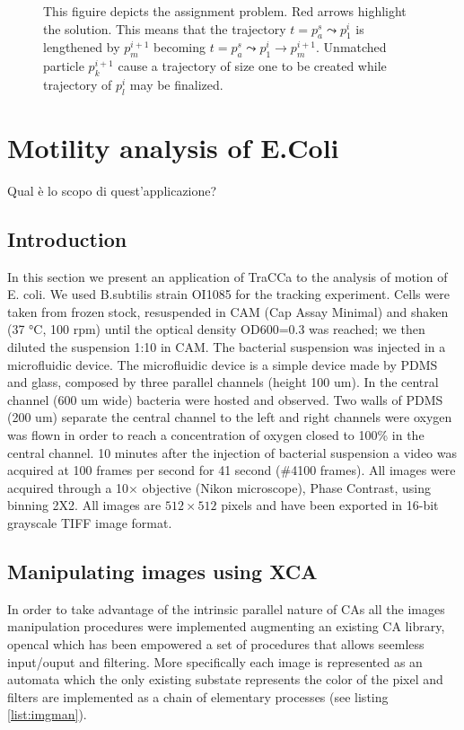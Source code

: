 \documentclass[conference]{IEEEtran}
\begin{document}
\begin{figure}
\label{fig:match}
\caption{This figuire depicts the assignment problem. Red arrows highlight the solution. This means that the trajectory $t=p^s_a \leadsto p^i_1$  is lengthened by $p^{i+1}_m$ becoming $t=p^s_a \leadsto p^i_1 \to p^{i+1}_m$. Unmatched particle $p^{i+1}_k$ cause a  trajectory of size one to be created while trajectory of $p^{i}_l$ may be finalized.}
\end{figure}

\section{Motility analysis of E.Coli}
Qual è lo scopo di quest'applicazione?
\subsection{Introduction}



In this section we present an application of TraCCa to the analysis of motion of E. coli.
We used B.subtilis strain OI1085 for the tracking experiment. Cells were taken from frozen stock, resuspended in CAM (Cap Assay Minimal) and shaken  (37 °C, 100 rpm) until the optical density OD600=0.3 was reached; we then diluted the suspension 1:10 in CAM. The bacterial suspension was injected in a microfluidic device. The microfluidic device is a simple device made by PDMS and glass, composed by three parallel channels (height 100 um). In the central channel (600 um wide) bacteria were hosted and observed. Two  walls of PDMS (200 um) separate the central channel to the left and right channels were oxygen was flown in order to reach a concentration of oxygen closed to 100\% in the central channel. 10 minutes after the injection of bacterial suspension a video was acquired at 100 frames per second for 41 second (\#4100 frames). All images were acquired through a 10$\times$ objective (Nikon microscope), Phase Contrast, using binning 2X2.
All images are $512 \times 512$ pixels and have been exported in 16-bit grayscale TIFF image format.

\subsection{Manipulating images using XCA}
	In order to take advantage of the intrinsic parallel nature of CAs all the images manipulation procedures were implemented augmenting an existing CA library, opencal\cite{dambrosio:2016} which has been empowered  a set of procedures that allows seemless input/ouput and filtering.
	More specifically each image is represented as an automata which the only existing substate represents the color of the pixel and filters are implemented as a chain of elementary processes (see listing \ref{list:imgman}).
\end{document}
